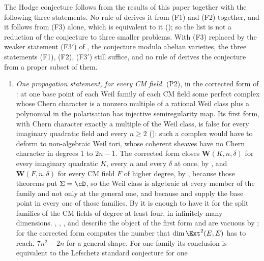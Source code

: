 \begin{corollary}\label{cor:fourremain}
The Hodge conjecture follows from the results of this paper together with the
following three statements. No rule of  derives it from
(F1) and (F2) together, and it follows from (F3) alone, which is equivalent
to it
(); so the list is not a reduction of the conjecture to
three smaller problems. With (F3) replaced by the weaker statement
\textup{(F3$'$)} of , the conjecture modulo abelian
varieties, the three statements (F1), (F2), \textup{(F3$'$)} still suffice,
and no rule of  derives the conjecture from a proper
subset of them.
\begin{enumerate}[label=\textup{(F\arabic*)},leftmargin=3.0em,itemsep=4pt]
\item \emph{One propagation statement, for every CM field.} \textup{(P2)},
  in the corrected form of : at one base point of each
  Weil family of each CM field some perfect complex whose Chern character is
  a nonzero multiple of a rational Weil class plus a polynomial in the
  polarisation has injective semiregularity map. Its first form, with Chern
  character exactly a multiple of the Weil class, is false for every
  imaginary quadratic field and every $n\ge2$ (): such a
  complex would have to deform to non-algebraic Weil tori, whose coherent
  sheaves have no Chern character in degrees $1$ to $2n-1$. The corrected form
  closes
  $\mathbf{W}(K,n,\delta)$
  for every imaginary quadratic $K$, every $n$ and every $\delta$ at once, by
  , and
  $\mathbf{W}(F,n,\delta)$ for every CM field $F$ of higher degree, by
  , because those theorems put $\Sigma=\cD$, so the
  Weil class is algebraic at every member of the family and not only at the
  general one, and because  and 
  supply the base point in every one of those families. By
   it is enough to have it for the split families of the
  CM fields of degree at least four, in infinitely many dimensions.
  , , ,
   and  describe the object of the
  first form and are vacuous by ; for the corrected form
   computes the number that $\dim\Ext^{2}(E,E)$ has
  to reach, $7n^{2}-2n$ for a general shape. For one family its
  conclusion is equivalent to the Lefschetz standard conjecture for one

\end{enumerate}
\end{corollary}

